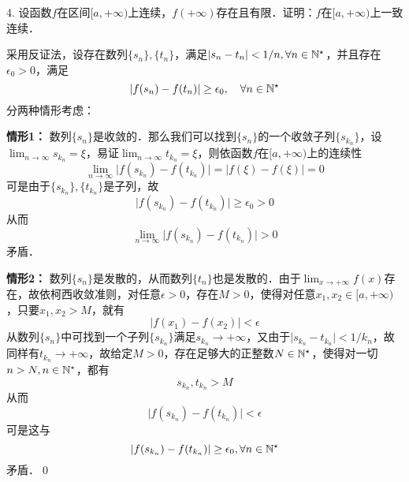 4. 设函数$f$在区间$[a, +\infty)$上连续，$f(+\infty)$存在且有限．证明：$f$在$[a, +\infty)$上一致连续．

\prove 采用反证法，设存在数列$\{ s_n \}, \{ t_n \}$，满足$\lvert s_n - t_n \rvert < 1/n, \forall n \in \mathbb{N}^\star$，并且存在$\epsilon_0 > 0$，满足
\begin{equation}
    \lvert f(s_n) - f(t_n) \rvert \geq \epsilon_0, \quad \forall n \in \mathbb{N}^\star
\end{equation}
分两种情形考虑：

\textbf{情形1：} 数列$\{ s_n \}$是收敛的．那么我们可以找到$\{ s_n \}$的一个收敛子列$\{ s_{k_n} \}$，设$\displaystyle\lim_{n \to \infty} s_{k_n} = \xi$，易证$\displaystyle\lim_{n \to \infty} t_{k_n} = \xi$，则依函数$f$在$[a,+\infty)$上的连续性
\begin{equation}
    \lim_{n \to \infty} \lvert f(s_{k_n}) - f(t_{k_n}) \rvert = \lvert f(\xi) - f(\xi) \rvert = 0
\end{equation}
可是由于$\{s_{k_n}\}, \{t_{k_n}\}$是子列，故
\begin{equation}
    \lvert f(s_{k_n}) - f(t_{k_n}) \rvert \geq \epsilon_0 > 0
\end{equation}
从而
\begin{equation}
    \lim_{n \to \infty} \lvert f(s_{k_n}) - f(t_{k_n}) \rvert > 0
\end{equation}
矛盾．

\textbf{情形2：} 数列$\{ s_n \}$是发散的，从而数列$\{ t_n \}$也是发散的．由于$\displaystyle\lim_{x \to +\infty} f(x)$存在，故依柯西收敛准则，对任意$\epsilon > 0$，存在$M > 0$，使得对任意$x_1, x_2 \in [a, +\infty)$，只要$x_1, x_2 > M$，就有
\begin{equation}
    \lvert f(x_1) - f(x_2) \rvert < \epsilon
\end{equation}
从数列$\{ s_n \}$中可找到一个子列$\{ s_{k_n}\}$满足$s_{k_n} \to +\infty$，又由于$\lvert s_{k_n} - t_{k_n} \rvert < 1/k_n$，故同样有$t_{k_n} \to +\infty$，故给定$M > 0$，存在足够大的正整数$N \in \mathbb{N}^\star$，使得对一切$n > N, n \in \mathbb{N}^\star$，都有
\begin{equation}
    s_{k_n}, t_{k_n} > M
\end{equation}
从而
\begin{equation}
    \lvert f(s_{k_n}) - f(t_{k_n}) \rvert < \epsilon
\end{equation}
可是这与
\begin{equation}
    \lvert f(s_{k_n}) - f(t_{k_n}) \rvert \geq \epsilon_0, \forall n \in \mathbb{N}^\star
\end{equation}
矛盾．\qed\bigskip